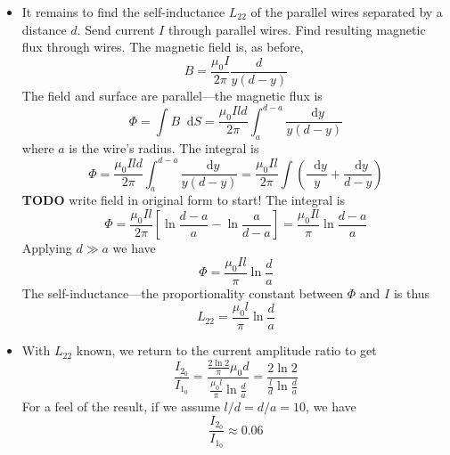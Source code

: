 \documentclass[11pt, a4paper]{article}
\newcommand{\diff}{\mathop{}\!\mathrm{d}} %
\renewcommand{\vec}[1]{\bm{#1}} %
\newcommand{\mm}{\mu_{0}}  %
\newcommand{\m}{\vec{m}}  %
\begin{document}
\begin{itemize}
	\item It remains to find the self-inductance $ L_{22} $ of the parallel wires separated by a distance $ d $. Send current $ I $ through parallel wires. Find resulting magnetic flux through wires. The magnetic field is, as before,
	\begin{equation*}
		B = \frac{\mm I}{2\pi} \frac{d}{y(d-y)}
	\end{equation*}
	The field and surface are parallel---the magnetic flux is
	\begin{equation*}
		\Phi = \int B \diff S = \frac{\mm I l d}{2 \pi}\int_{a}^{d-a} \frac{\diff y}{y(d-y)}
	\end{equation*}
	where $ a $ is the wire's radius. The integral is 
	\begin{equation*}
		\Phi = \frac{\mm I l d}{2 \pi}\int_{a}^{d-a} \frac{\diff y}{y(d-y)} =  \frac{\mm I l}{2 \pi} \int \left(\frac{\diff y}{y} + \frac{\diff y}{d-y}\right)
	\end{equation*}
	\textbf{TODO} write field in original form to start! The integral is 
	\begin{equation*}
		\Phi = \frac{\mm I l}{2 \pi}\left[\ln \frac{d-a}{a} - \ln \frac{a}{d-a}\right] = \frac{\mm I l}{\pi} \ln \frac{d-a}{a}
	\end{equation*}
	Applying $ d \gg a $ we have
	\begin{equation*}
		\Phi = \frac{\mm I l}{\pi} \ln \frac{d}{a}
	\end{equation*}
	The self-inductance---the proportionality constant between $ \Phi $ and $ I $ is thus
	\begin{equation*}
		L_{22} = \frac{\mm l}{\pi}\ln \frac{d}{a}
	\end{equation*}
	
	\item With $ L_{22} $ known, we return to the current amplitude ratio to get
	\begin{equation*}
		\frac{I_{2_{0}}}{I_{1_{0}}} = \frac{\frac{2\ln 2}{\pi} \mm d}{\frac{\mm l}{\pi}\ln \frac{d}{a}} = \frac{2\ln 2}{\frac{l}{d} \ln \frac{d}{a}}
	\end{equation*}
	For a feel of the result, if we assume $ l/d = d/a = 10 $, we have 
	\begin{equation*}
		\frac{I_{2_{0}}}{I_{1_{0}}} \approx 0.06
	\end{equation*}
\end{itemize}
\end{document}
